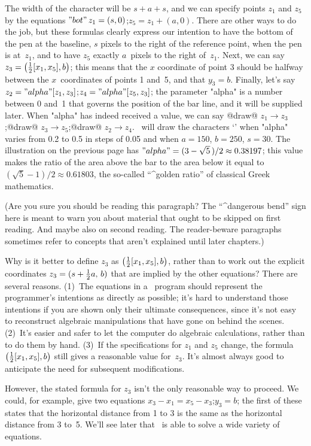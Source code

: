 The width of the character will be $s+a+s$, and we can specify points
$z_1$ and $z_5$ by the equations
\begindisplay
$"bot"\,z_1=(s,0)$;\qquad $z_5=z_1+(a,0)$.
\enddisplay
There are other ways to do the job, but these formulas clearly express
our intention to have the bottom of the pen at the baseline, $s$ pixels
to the right of the reference point, when the pen is at~$z_1$,
and to have $z_5$ exactly $a$~pixels to the right of~$z_1$.
Next, we can say
\begindisplay
$z_3=\bigl({1\over2}[x_1,x_5],b\bigr)$;
\enddisplay
this means that the $x$ coordinate of point 3 should be halfway between
the $x$~coordinates of points 1 and~5, and that $y_3=b$.  Finally, let's say
\begindisplay
$z_2="alpha"[z_1,z_3]$;\qquad $z_4="alpha"[z_5,z_3]$;
\enddisplay
the parameter "alpha" is a number between 0 and~1 that governs the
position of the bar line, and it will be supplied later. When "alpha"
has indeed received a value, we can say
\begindisplay
@draw@ $z_1\to z_3$;\qquad @draw@ $z_3\to z_5$;\qquad @draw@ $z_2\to z_4$.
\enddisplay
\MF\ will draw the characters `{\manual\sevenAs}' when "alpha" varies
from 0.2 to 0.5 in steps of 0.05 and when $a=150$, $b=250$, $s=30$.
The illustration on the previous page has $"alpha"=(3-\sqrt5\,)/2\approx
0.38197$; this value makes the ratio of the area above the bar to the area
below it equal to $(\sqrt5-1)/2\approx0.61803$, the so-called ``^{golden
ratio}'' of classical Greek mathematics.

\danger (Are you sure you should be reading this paragraph? The
``^{dangerous bend}'' sign here is meant to warn you about material that
ought to be skipped on first reading. And maybe also on second reading.
The reader-beware paragraphs sometimes refer to concepts that aren't
explained until later chapters.)

\dangerexercise Why is it better to define $z_3$ as $\bigl({1\over2}[x_1,
x_5],b\bigr)$, rather than to work out the explicit coordinates
$z_3=(s+{1\over2}a,\,b)$ that are implied by the other equations?
\answer There are several reasons. (1)~The equations in a \MF\ program
should represent the programmer's intentions as directly as possible;
it's hard to understand those intentions if you are shown only
their ultimate consequences, since it's not easy to reconstruct algebraic
manipulations that have gone on behind the scenes. (2)~It's easier and
safer to let the computer do algebraic calculations, rather than
to do them by hand. (3)~If the specifications for $z_1$ and $z_5$ change,
the formula $\bigl({1\over2}[x_1,x_5],b\bigr)$
still gives a reasonable value for~$z_3$. It's
almost always good to anticipate the need for subsequent modifications.\par
However, the stated formula for $z_3$ isn't the only reasonable way to
proceed. We could, for example, give two equations
\begindisplay
$x_3-x_1=x_5-x_3$;\qquad $y_3=b$;
\enddisplay
the first of these states that the horizontal distance from 1 to 3 is
the same as the horizontal distance from 3 to~5. We'll see later that
\MF\ is able to solve a wide variety of equations.

